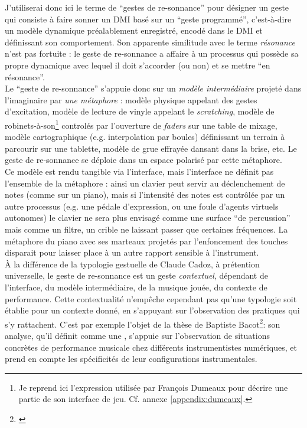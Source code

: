 \noindent J'utiliserai donc ici le terme de ``gestes de re-sonnance'' pour désigner un geste qui consiste à faire sonner un \gls{DMI} basé sur un ``geste programmé'', c'est-à-dire un modèle dynamique préalablement enregistré, encodé dans le \gls{DMI} et définissant son comportement. Son apparente similitude avec le terme \textit{résonance} n'est pas fortuite : le geste de re-sonnance a affaire à un processus qui possède sa propre dynamique avec lequel il doit s'accorder (ou non) et se mettre ``en résonance''.\\
\indent Le ``geste de re-sonnance'' s'appuie donc sur un \textit{modèle intermédiaire} projeté dans l'imaginaire par \textit{une métaphore} : modèle physique appelant des gestes d'excitation, modèle de lecture de vinyle appelant le \textit{scratching}, modèle de robinets-à-son\footnote{Je reprend ici l'expression utilisée par François Dumeaux pour décrire une partie de son interface de jeu. Cf. annexe \ref{appendix:dumeaux}.} controlés par l'ouverture de \textit{faders} sur une table de mixage, modèle cartographique (e.g. interpolation par boules) définissant un terrain à parcourir sur une tablette, modèle de grue effrayée dansant dans la brise, etc. Le geste de re-sonnance se déploie dans un espace polarisé par cette métaphore.\\
\indent Ce modèle est rendu tangible via l'interface, mais l'interface ne définit pas l'ensemble de la métaphore : ainsi un clavier peut servir au déclenchement de notes (comme sur un piano), mais si l'intensité des notes est contrôlée par un autre processus (e.g. une pédale d'expression, ou une foule d'agents virtuels autonomes) le clavier ne sera plus envisagé comme une surface ``de percussion'' mais comme un filtre, un crible ne laissant passer que certaines fréquences. La métaphore du piano avec ses marteaux projetés par l'enfoncement des touches disparait pour laisser place à un autre rapport sensible à l'instrument.\\
\indent À la différence de la typologie gestuelle de Claude Cadoz, à prétention universelle, le geste de re-sonnance est un geste \textit{contextuel}, dépendant de l'interface, du modèle intermédiaire, de la musique jouée, du contexte de performance. Cette contextualité n'empêche cependant pas qu'une typologie soit établie pour un contexte donné, en s'appuyant sur l'observation des pratiques qui s'y rattachent. C'est par exemple l'objet de la thèse de Baptiste Bacot\footnote{\cite{bacot_geste_2017}}: son analyse, qu'il définit comme une , s'appuie sur l'observation de situations concrètes de performance musicale chez différents instrumentistes numériques, et prend en compte les spécificités de leur configurations instrumentales.\\
